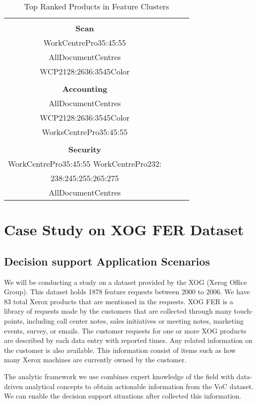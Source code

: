 \documentclass[sigconf]{acmart}
\begin{document}
\begin{table}[h!]
    \centering
    \begin{tabular}{|c|c|c|c|}
    \hline
\\
\textbf{Scan} \\

\hline
WorkCentrePro35:45:55\\
AllDocumentCentres \\
WCP2128:2636:3545Color\\
\hline
\\
\textbf{Accounting}\\
\hline
AllDocumentCentres\\
WCP2128:2636:3545Color\\
WorksCentrePro35:45:55\\
\hline
\\
\textbf{Security}\\
\hline
WorkCentrePro35:45:55
WorkCentrePro232: \\
238:245:255:265:275\\
AllDocumentCentres\\
\hline
    \end{tabular}
    \caption{Top Ranked Products in Feature Clusters}
    \label{tab:4}
\end{table}

\section{Case Study on XOG FER Dataset}
\subsection{Decision support Application Scenarios}

We will be conducting a study on a dataset provided by the XOG (Xerog Office Group). This dataset holds 1878 feature requests between 2000 to 2006. We have 83 total Xerox products that are mentioned in the requests. XOG FER is a library of requests made by the customers that are collected through many touch-points, including call center notes, sales initiatives or meeting notes, marketing events, survey, or emails. The customer requests for one or more XOG products are described by each data entry with reported times. Any related information on the customer is also available. This information consist of items such as how many Xerox machines are currently owned by the customer. 

The analytic framework we use combines expert knowledge of the field with data-driven analytical concepts to obtain actionable information from the VoC dataset. We can enable the decision support situations after collected this information.
\end{document}
